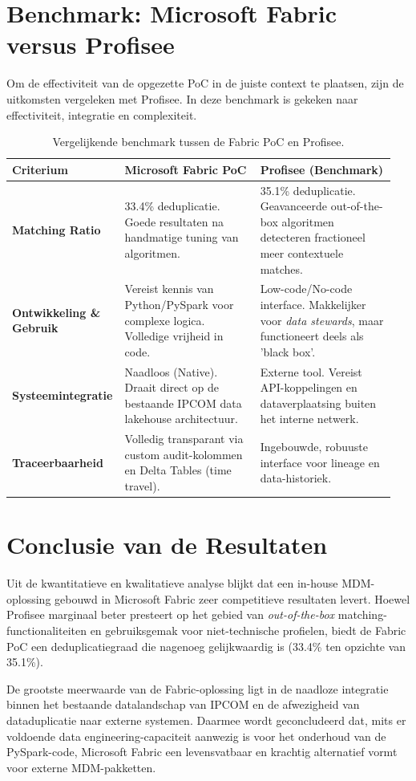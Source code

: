 \section{Benchmark: Microsoft Fabric versus Profisee}%
\label{sec:res-benchmark}

Om de effectiviteit van de opgezette PoC in de juiste context te plaatsen, zijn de uitkomsten vergeleken met Profisee. In deze benchmark is gekeken naar effectiviteit, integratie en complexiteit.

\begin{table}[h]
\centering
\renewcommand{\arraystretch}{1.3}
\begin{tabular}{|p{0.25\linewidth}|p{0.35\linewidth}|p{0.35\linewidth}|}
\hline
\textbf{Criterium} & \textbf{Microsoft Fabric PoC} & \textbf{Profisee (Benchmark)} \\ \hline
\textbf{Matching Ratio} & 33.4\% deduplicatie. Goede resultaten na handmatige tuning van algoritmen. & 35.1\% deduplicatie. Geavanceerde out-of-the-box algoritmen detecteren fractioneel meer contextuele matches. \\ \hline
\textbf{Ontwikkeling \& Gebruik} & Vereist kennis van Python/PySpark voor complexe logica. Volledige vrijheid in code. & Low-code/No-code interface. Makkelijker voor \textit{data stewards}, maar functioneert deels als 'black box'. \\ \hline
\textbf{Systeemintegratie} & Naadloos (Native). Draait direct op de bestaande IPCOM data lakehouse architectuur. & Externe tool. Vereist API-koppelingen en dataverplaatsing buiten het interne netwerk. \\ \hline
\textbf{Traceerbaarheid} & Volledig transparant via custom audit-kolommen en Delta Tables (time travel). & Ingebouwde, robuuste interface voor lineage en data-historiek. \\ \hline
\end{tabular}
\caption{Vergelijkende benchmark tussen de Fabric PoC en Profisee.}
\label{tab:benchmark}
\end{table}

\section{Conclusie van de Resultaten}%
\label{sec:res-conclusie}

Uit de kwantitatieve en kwalitatieve analyse blijkt dat een in-house MDM-oplossing gebouwd in Microsoft Fabric zeer competitieve resultaten levert. Hoewel Profisee marginaal beter presteert op het gebied van \textit{out-of-the-box} matching-functionaliteiten en gebruiksgemak voor niet-technische profielen, biedt de Fabric PoC een deduplicatiegraad die nagenoeg gelijkwaardig is (33.4\% ten opzichte van 35.1\%). 

De grootste meerwaarde van de Fabric-oplossing ligt in de naadloze integratie binnen het bestaande datalandschap van IPCOM en de afwezigheid van dataduplicatie naar externe systemen. Daarmee wordt geconcludeerd dat, mits er voldoende data engineering-capaciteit aanwezig is voor het onderhoud van de PySpark-code, Microsoft Fabric een levensvatbaar en krachtig alternatief vormt voor externe MDM-pakketten.